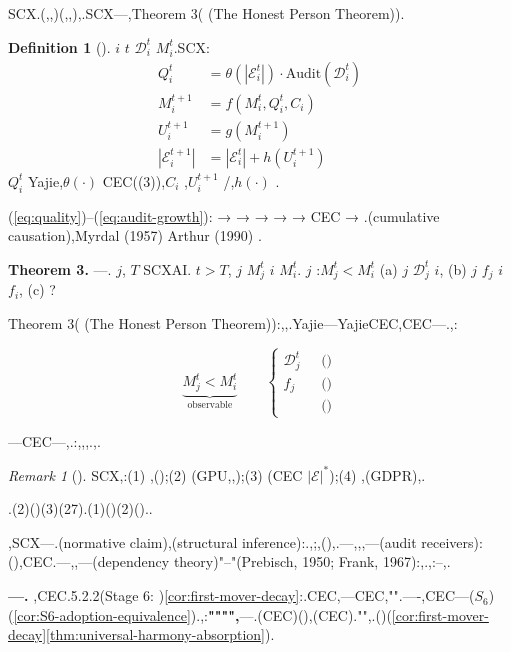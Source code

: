 \documentclass[12pt,a4paper]{article}
\theoremstyle{definition}
\newtheorem{definition}{Definition}[section]
\theoremstyle{remark}
\newtheorem{remark}{Remark}[section]
\begin{document}
\subsection{}

SCX.(,,)(,,),.SCX---,Theorem 3( (The Honest Person Theorem)).

\begin{definition}[]
 $i$  $t$  $\mathcal{D}_i^t$  $M_i^t$.SCX:
\begin{align}
Q_i^t &= \theta(|\mathcal{E}_i^t|) \cdot \text{Audit}(\mathcal{D}_i^t) \label{eq:quality}\\
M_i^{t+1} &= f(M_i^t, Q_i^t, C_i) \label{eq:model}\\
U_i^{t+1} &= g(M_i^{t+1}) \label{eq:users}\\
|\mathcal{E}_i^{t+1}| &= |\mathcal{E}_i^t| + h(U_i^{t+1}) \label{eq:audit-growth}
\end{align}
 $Q_i^t$ Yajie,$\theta(\cdot)$ CEC((3)),$C_i$ ,$U_i^{t+1}$ /,$h(\cdot)$ .
\end{definition}

(\ref{eq:quality})–(\ref{eq:audit-growth}): →  →  →  →  → CEC → .(cumulative causation),Myrdal (1957)  Arthur (1990) .

\textbf{Theorem 3.} ---\textit{}. $j$, $T$ SCXAI. $t > T$, $j$  $M_j^t$  $i$  $M_i^t$. $j$ :$M_j^t < M_i^t$  (a) $j$  $\mathcal{D}_j^t$  $i$, (b) $j$  $f_j$  $i$  $f_i$, (c) ?

Theorem 3( (The Honest Person Theorem)):,,.Yajie---YajieCEC,CEC---.,:

\begin{equation}
\underbrace{M_j^t < M_i^t}_{\text{observable}} \quad \text{} \quad \begin{cases}
\mathcal{D}_j^t \text{ } &\text{()}\\
f_j \text{ } &\text{()}\\
\text{} &\text{()}
\end{cases}
\end{equation}

---CEC---,.:,,,.,.

\begin{remark}[]
SCX,:(1) ,();(2) (GPU,,);(3) (CEC $|\mathcal{E}|^*$);(4) ,(GDPR),.

.(2)()(3)(27).(1)()(2)()..

,SCX---.(normative claim),(structural inference):.,;,(),.---,,,---(audit receivers):(),CEC.---,,---(dependency theory)"–"(Prebisch, 1950; Frank, 1967):,.,:–,.

\textbf{---.} ,CEC\textit{}.5.2.2(Stage 6: )\ref{cor:first-mover-decay}:.CEC,---CEC,"".----,CEC---($S_6$)(\ref{cor:S6-adoption-equivalence}).,:\textbf{"""",}---.(CEC)(),(CEC)."",.()(\ref{cor:first-mover-decay}\ref{thm:universal-harmony-absorption}).
\end{remark}
\end{document}
